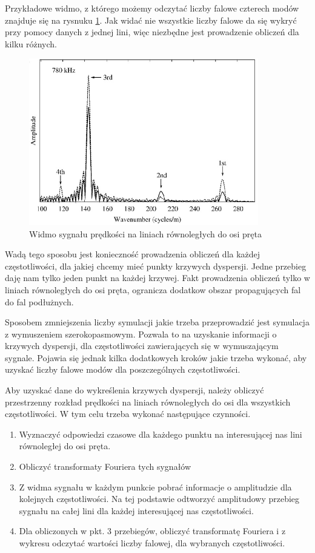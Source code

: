 Przykładowe widmo, z którego możemy odczytać liczby falowe czterech modów znajduje się na rysnuku \ref{fig:widmo_wymuszenie1}. Jak widać nie wszystkie liczby falowe da się wykryć przy pomocy danych z jednej lini, więc niezbędne jest prowadzenie obliczeń dla kilku różnych.

\begin{figure}[h]
\centering
\includegraphics[width=10cm]{Zdjecia/2/widmo_wymuszenia_waskopasmowe}
\caption{Widmo sygnału prędkości na liniach równoległych do osi pręta}
\label{fig:widmo_wymuszenie1}
\end{figure}

Wadą tego sposobu jest konieczność prowadzenia obliczeń dla każdej częstotliwości, dla jakiej chcemy mieć punkty krzywych dyspersji. Jedne przebieg daję nam tylko jeden punkt na każdej krzywej. Fakt prowadzenia obliczeń tylko w liniach równoległych do osi pręta, ogranicza dodatkow obszar propagujących fal do fal podłużnych.

Sposobem zmniejszenia liczby symulacji jakie trzeba przeprowadzić jest symulacja z wymuszeniem szerokopasmowym. Pozwala to na uzyskanie informacji o krzywych dyspersji, dla częstotliwości zawierających się w wymuszającym sygnale. Pojawia się jednak kilka dodatkowych kroków jakie trzeba wykonać, aby uzyskać liczby falowe modów dla poszczególnych częstotliwości.

Aby uzyskać dane do wykreślenia krzywych dyspersji, należy obliczyć przestrzenny rozkład prędkości na liniach równoległych do osi dla wszystkich częstotliwości. W tym celu trzeba wykonać następujące czynności.

\begin{enumerate}
  \item Wyznaczyć odpowiedzi czasowe dla każdego punktu na interesującej nas lini równoległej do osi pręta.
  \item Obliczyć transformaty Fouriera tych sygnałów
  \item Z widma sygnału w każdym punkcie pobrać informacje o amplitudzie dla kolejnych częstotliwości. Na tej podstawie odtworzyć amplitudowy przebieg sygnału na całej lini dla każdej interesującej nas częstotliwości.
  \item Dla obliczonych w pkt. 3 przebiegów, obliczyć transformatę Fouriera i z wykresu odczytać wartości liczby falowej, dla wybranych częstotliwości.
\end{enumerate}

